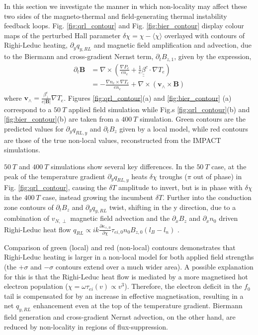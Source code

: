 \documentclass[aip,reprint]{revtex4-1}
\newcommand*{\dbul}[1]{%
	\underline{\underline{ #1}}
}
\begin{document}
In this section we investigate the manner in which non-locality may affect these two sides of the magneto-thermal and field-generating thermal instability feedback loops.  Fig.  \ref{fig:qrl_contour} and Fig. \ref{fig:bier_contour} display colour maps of the perturbed Hall parameter $\delta \chi = \chi - \langle \chi \rangle$ overlayed with contours of Righi-Leduc heating, $\partial_y q_{y,RL}$ and magnetic field amplification and advection, due to the Biermann and cross-gradient Nernst term, $\partial_t B_{z,1}$,  given by the expression,
\begin{eqnarray}
\partial_t \mathbf{B} &= \nabla \times\left( \frac{\nabla P_e}{e n_e} + \frac{1}{e} \dbul{\beta}^c \cdot \nabla T_e  \right)\nonumber\\
&= - \frac{\nabla n_e \times \nabla T_e}{e n_e} + \nabla \times (\mathbf{v_{\wedge} } \times \mathbf{B})
\end{eqnarray}
where $\mathbf{v}_{\wedge} = \frac{\beta^c_{\perp}}{e |\mathbf{B}|}\nabla T_e$.  Figures \ref{fig:qrl_contour}(a) and \ref{fig:bier_contour} (a) correspond to a $\SI{50}{T}$ applied field simulation while Fig.s \ref{fig:qrl_contour}(b) and \ref{fig:bier_contour}(b) are taken from a $\SI{400}{T}$ simulation. Green contours are the predicted values for $\partial_y q_{RL,y}$ and $\partial_t B_{z}$ given by a local model, while red contours are those of the true non-local values, reconstructed from the IMPACT simulations.

 $\SI{50}{T}$ and $\SI{400}{T}$ simulations show several key differences.  In the  $\SI{50}{T}$  case, at the peak of the temperature gradient  $\partial_y q_{RL,y}$ heats $\delta \chi $ troughs ($\pi$ out of phase) in Fig. \ref{fig:qrl_contour}, causing the $\delta T$ amplitude to invert, but is in phase with $\delta \chi$ in the $\SI{400}{T}$ case, instead growing the incumbent $\delta T$. Further into the conduction zone contours of $\partial_t B_{z}$ and $\partial_y q_{y,RL}$ twist, shifting in the y direction, due to a combination of $v_{N,\perp}$ magnetic field advection and the $\partial_x B_{z}$ and $\partial_x n_0$ driven Righi-Leduc heat flow $q_{RL} \propto i k \frac{\partial \kappa_{\wedge,0}}{\partial \chi} \tau_{ei,0} n_0 B_{z,0}\left(l_B - l_n \right)$ .

Comparison of green (local) and red (non-local) contours  demonstrates that Righi-Leduc heating is larger in a non-local model for both applied field strengths (the $+\sigma$ and $-\sigma$ contours extend over a much wider area). A possible explanation for this is that the Righi-Leduc heat flow is mediated by a more magnetised hot electron population ($\chi = \omega \tau_{ei}(v) \propto v^3$). Therefore, the electron deficit in the $f_0$ tail is compensated for by an increase in effective magnetisation, resulting in a net $q_{y,RL}$ enhancement even at the top of the temperature gradient.   Biermann field generation and cross-gradient Nernst advection, on the other hand, are reduced by non-locality in regions of flux-suppression. 
\end{document}

